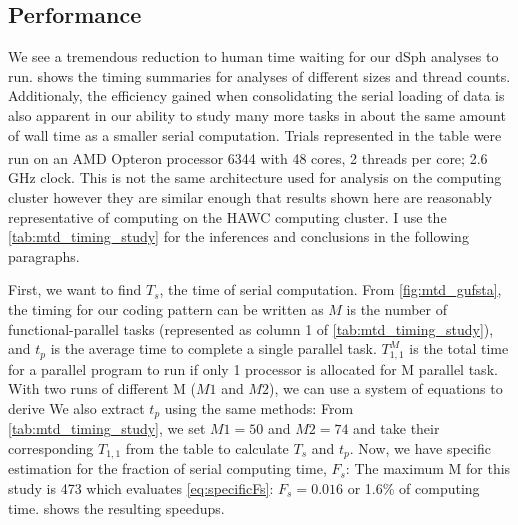 \subsection{Performance}\label{sec:mtd_performance}



We see a tremendous reduction to human time waiting for our dSph analyses to run.
 shows the timing summaries for analyses of different sizes and thread counts.
Additionaly, the efficiency gained when consolidating the serial loading of data is also apparent in our ability to study many more tasks in about the same amount of wall time as a smaller serial computation.
Trials represented in the table were run on an AMD Opteron\textsuperscript{\textregistered} processor 6344 with 48 cores, 2 threads per core; 2.6 GHz clock.
This is not the same architecture used for analysis on the computing cluster however they are similar enough that results shown here are reasonably representative of computing on the HAWC computing cluster.
I use the \cref{tab:mtd_timing_study} for the inferences and conclusions in the following paragraphs.

First, we want to find $T_s$, the time of serial computation.
From \cref{fig:mtd_gufsta}, the timing for our coding pattern can be written as
\TimingAll
$M$ is the number of functional-parallel tasks (represented as column 1 of \cref{tab:mtd_timing_study}), and $t_p$ is the average time to complete a single parallel task.
$T^M_{1,1}$ is the total time for a parallel program to run if only 1 processor is allocated for M parallel task.
With two runs of different M ($M1$ and $M2$), we can use a system of equations to derive
\TsfromMs
We also extract $t_p$ using the same methods:
\TpfromMs
From \cref{tab:mtd_timing_study}, we set $M1 = 50$ and $M2 = 74$ and take their corresponding $T_{1,1}$ from the table to calculate $T_s$ and $t_p$.
Now, we have specific estimation for the fraction of serial computing time, $F_s$:
The maximum M for this study is 473 which evaluates \cref{eq:specificFs}: $F_s = 0.016$ or 1.6\% of computing time.
 shows the resulting speedups.



